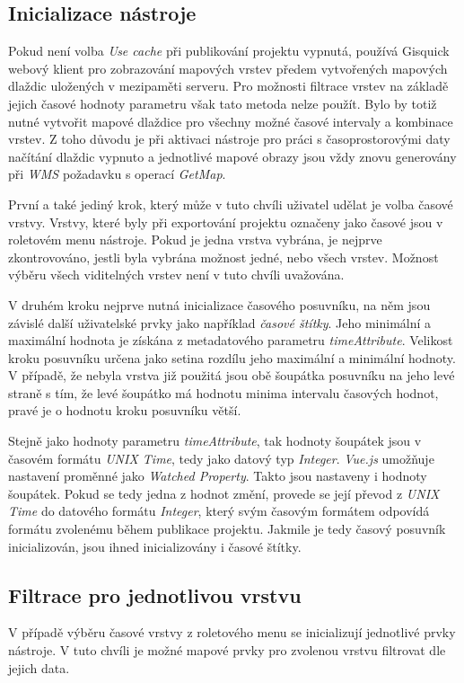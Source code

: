 \subsection{Inicializace nástroje}

Pokud není volba \textit{Use cache} při publikování projektu vypnutá,  používá Gisquick webový klient pro zobrazování mapových vrstev předem vytvořených mapových dlaždic uložených v mezipaměti serveru. Pro možnosti filtrace vrstev na základě jejich časové hodnoty parametru však tato metoda nelze použít. Bylo by totiž nutné vytvořit mapové dlaždice pro všechny možné časové intervaly a kombinace vrstev. Z toho důvodu je při aktivaci nástroje pro práci s časoprostorovými daty načítání dlaždic vypnuto a jednotlivé mapové obrazy jsou vždy znovu generovány při \textit{WMS} požadavku s operací \textit{GetMap}.

První a také jediný krok, který může v tuto chvíli uživatel udělat je volba časové vrstvy. Vrstvy, které byly při exportování projektu označeny jako časové jsou v roletovém menu nástroje. Pokud je jedna vrstva vybrána, je nejprve zkontrovováno, jestli byla vybrána možnost jedné, nebo všech vrstev. Možnost výběru všech viditelných vrstev není v tuto chvíli uvažována. 

V druhém kroku nejprve nutná inicializace časového posuvníku, na něm jsou závislé další uživatelské prvky jako například \textit{časové štítky}. Jeho minimální a maximální hodnota je získána z metadatového parametru \textit{timeAttribute}. Velikost kroku posuvníku určena jako setina rozdílu jeho maximální a minimální hodnoty. V případě, že nebyla vrstva již použitá jsou obě šoupátka posuvníku na jeho levé straně s tím, že levé šoupátko má hodnotu minima intervalu časových hodnot, pravé je o hodnotu kroku posuvníku větší. 

Stejně jako hodnoty parametru \textit{timeAttribute}, tak hodnoty šoupátek jsou v časovém formátu \textit{UNIX Time}, tedy jako datový typ \textit{Integer}. \textit{Vue.js} umožňuje nastavení proměnné jako \textit{Watched Property}. Takto jsou nastaveny i hodnoty šoupátek. Pokud se tedy jedna z hodnot změní, provede se její převod z \textit{UNIX Time} do datového formátu \textit{Integer}, který svým časovým formátem odpovídá formátu zvolenému během publikace projektu. Jakmile je tedy časový posuvník inicializován, jsou ihned inicializovány i časové štítky.


\subsection{Filtrace pro jednotlivou vrstvu}
V případě výběru časové vrstvy z roletového menu se inicializují jednotlivé prvky nástroje. V tuto chvíli je možné mapové prvky pro zvolenou vrstvu filtrovat dle jejich data.

